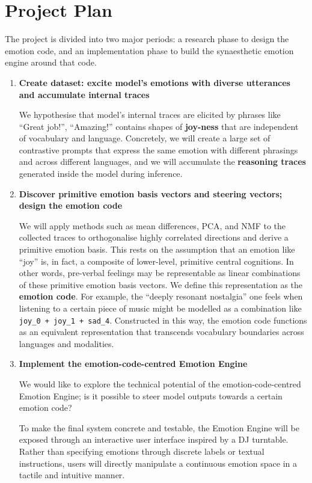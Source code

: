 \documentclass[12pt,twoside]{report}
\begin{document}
\chapter{Project Plan}

The project is divided into two major periods: a research phase to design the emotion code, and an implementation phase to build the synaesthetic emotion engine around that code.
\begin{enumerate}
    \item \textbf{Create dataset: excite model's emotions with diverse utterances and accumulate internal traces} 
    
    We hypothesise that model’s internal traces are elicited by phrases like ``Great job!'', ``Amazing!'' contains shapes of \textbf{joy-ness} that are independent of vocabulary and language. Concretely, we will create a large set of contrastive prompts that express the same emotion with different phrasings and across different languages, and we will accumulate the \textbf{reasoning traces} generated inside the model during inference.
    \item \textbf{Discover primitive emotion basis vectors and steering vectors; design the emotion code} 

    We will apply methods such as mean differences, PCA, and NMF to the collected traces to orthogonalise highly correlated directions and derive a primitive emotion basis. This rests on the assumption that an emotion like ``joy'' is, in fact, a composite of lower-level, primitive central cognitions. In other words, pre-verbal feelings may be representable as linear combinations of these primitive emotion basis vectors. We define this representation as the \textbf{emotion code}. For example, the ``deeply resonant nostalgia'' one feels when listening to a certain piece of music might be modelled as a combination like \verb|joy_0 + joy_1 + sad_4|. Constructed in this way, the emotion code functions as an equivalent representation that transcends vocabulary boundaries across languages and modalities.
    \item \textbf{Implement the emotion-code-centred Emotion Engine} \par
    We would like to explore the technical potential of the emotion-code-centred Emotion Engine; is it possible to steer model outputs towards a certain emotion code? 

    To make the final system concrete and testable, the Emotion Engine will be exposed through an interactive user interface inspired by a DJ turntable. Rather than specifying emotions through discrete labels or textual instructions, users will directly manipulate a continuous emotion space in a tactile and intuitive manner.


\end{enumerate}
\end{document}
